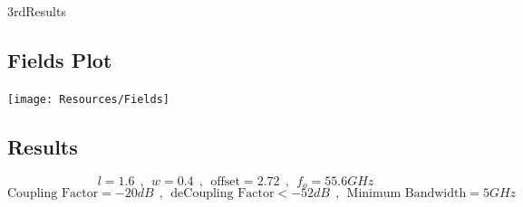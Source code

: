 \documentclass{article}
\begin{document}
\begin{homeworkProblem}{3rd}{Results}
\subsection{Fields Plot}
\begin{minipage}{\linewidth}
\texttt{[image: Resources/Fields]}
\centering
{}
~\\
\subsection{Results}
$$ l = 1.6 ~~ , ~~ w = 0.4 ~~ , ~~  \text{offset} = 2.72 ~~ , ~~ f_o = 55.6GHz $$
$$ \text{Coupling Factor} = -20dB ~~ , ~~ \text{deCoupling Factor} < -52dB ~~ , ~~  \text{Minimum Bandwidth} = 5GHz $$
\end{minipage}
\end{homeworkProblem}
\end{document}
